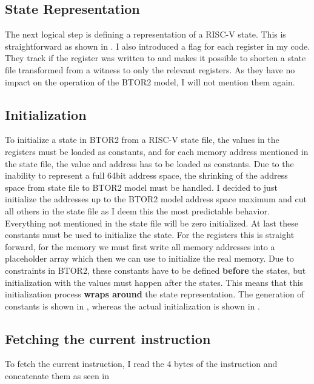 


\subsection{State Representation}
The next logical step is defining a representation of a RISC-V state.
This is straightforward as shown in . I also
introduced a flag for each register in my code. They track if the
register was written to and makes it possible to shorten a state file
transformed from a witness to only the relevant registers. As they
have no impact on the operation of the BTOR2 model, I will not
mention them again. 

\subsection{Initialization}\label{sec:initialization}
To initialize a state in BTOR2 from a RISC-V state file, the values
in the registers must be loaded as constants, and for each memory
address mentioned in the state file, the value and address has to be
loaded as constants. Due to the inability to represent a full 64bit
address space, the shrinking of the address space from state file to
BTOR2 model must be handled. I decided to just initialize the
addresses up to the BTOR2 model address space maximum and cut all
others in the state file as I deem this the most predictable
behavior. Everything not mentioned in the state file will be zero
initialized. At last these constants must be used to initialize the
state. For the registers this is straight forward, for the memory we
must first write all memory addresses into a placeholder array which
then we can use to initialize the real memory. Due to constraints in
BTOR2, these constants have to be defined \textbf{before} the states,
but initialization with the values must happen after the states. This
means that this initialization process \textbf{wraps around} the
state representation. The generation of constants is shown in
, whereas the actual
initialization is shown in .



\subsection{Fetching the current instruction}
To fetch the current instruction, I read the 4 bytes of the
instruction and concatenate them as seen in 


